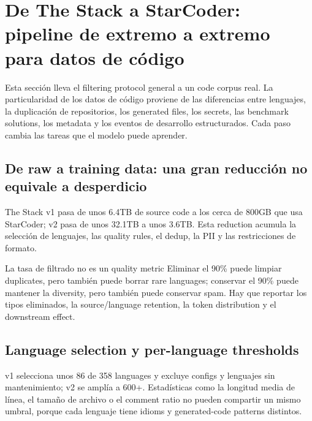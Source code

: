\section{De The Stack a StarCoder: pipeline de extremo a extremo para datos de código}

Esta sección lleva el filtering protocol general a un code corpus real. La particularidad de los datos de código proviene de las diferencias entre lenguajes, la duplicación de repositorios, los generated files, los secrets, las benchmark solutions, los metadata y los eventos de desarrollo estructurados. Cada paso cambia las tareas que el modelo puede aprender.

\subsection{De raw a training data: una gran reducción no equivale a desperdicio}

The Stack v1 pasa de unos 6.4TB de source code a los cerca de 800GB que usa StarCoder; v2 pasa de unos 32.1TB a unos 3.6TB. Esta reduction acumula la selección de lenguajes, las quality rules, el dedup, la PII y las restricciones de formato.



\begin{warningbox}{La tasa de filtrado no es un quality metric}
Eliminar el 90\% puede limpiar duplicates, pero también puede borrar rare languages; conservar el 90\% puede mantener la diversity, pero también puede conservar spam. Hay que reportar los tipos eliminados, la source/language retention, la token distribution y el downstream effect.
\end{warningbox}

\subsection{Language selection y per-language thresholds}

v1 selecciona unos 86 de 358 languages y excluye configs y lenguajes sin mantenimiento; v2 se amplía a 600+. Estadísticas como la longitud media de línea, el tamaño de archivo o el comment ratio no pueden compartir un mismo umbral, porque cada lenguaje tiene idioms y generated-code patterns distintos.

